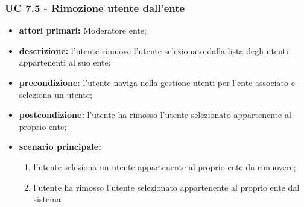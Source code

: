 			\subsubsection{UC 7.5 - Rimozione utente dall'ente}
			\begin{itemize}
				\item \textbf{attori primari:} Moderatore ente;
				\item \textbf{descrizione:} l'utente rimuove l'utente selezionato dalla lista degli utenti appartenenti al suo ente;
				\item \textbf{precondizione:} l'utente naviga nella gestione utenti per l'ente associato e seleziona un utente;
				\item \textbf{postcondizione:} l'utente ha rimosso l'utente selezionato appartenente al proprio ente;
				\item \textbf{scenario principale:}
				\begin{enumerate}
					\item{l'utente seleziona un utente appartenente al proprio ente da rimuovere;}
					\item{l'utente ha rimosso l'utente selezionato appartenente al proprio ente dal sistema.}
				\end{enumerate}		
			\end{itemize}
